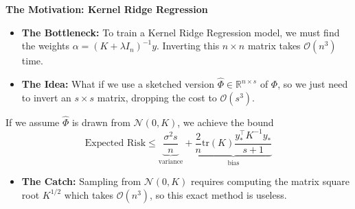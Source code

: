 \documentclass[
11pt,notheorems,hyperref={pdfauthor=whatever}
]{beamer}
\begin{document}
\begin{frame}
    \textbf{The Motivation: Kernel Ridge Regression}
    \begin{itemize}
        \item \alert{\textbf{The Bottleneck:}} To train a Kernel Ridge Regression model, we must find the weights \(\alpha = (K + \lambda I_n)^{-1}y\). Inverting this \(n \times n\) matrix takes \(\mathcal{O}(n^3)\) time.
        \item \alert{\textbf{The Idea:}} What if we use a sketched version \(\hat{\Phi} \in \mathbb{R}^{n \times s}\) of \(\Phi\), so we just need to invert an \(s \times s\) matrix, dropping the cost to \(\mathcal{O}(s^3)\).
    \end{itemize}
    If we assume \(\hat{\Phi}\) is drawn from \(\mathcal{N}(0, K)\), we achieve the bound
    \[
        \text{Expected Risk} \le \underbrace{\frac{\sigma^2 s}{n}}_{\text{variance}} + \underbrace{\frac{2}{n}\text{tr}(K)\frac{y_*^\top K^{-1} y_*}{s+1}}_{\text{bias}}
    \]

    \vspace{0.2cm}
    \begin{itemize}
        \item \alert{\textbf{The Catch:}} Sampling from \(\mathcal{N}(0, K)\) requires computing the matrix square root \(K^{1/2}\) which takes \(\mathcal{O}(n^3)\), so this exact method is useless.
    \end{itemize}
\end{frame}
\end{document}
